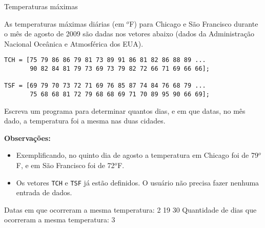 \documentclass[11pt]{practice}
\begin{document}
\begin{task}{Temperaturas máximas}{}

  As temperaturas máximas diárias (em $^o$F) para Chicago e São
  Francisco durante o mês de agosto de 2009 são dadas nos vetores abaixo
  (dados da Administração Nacional Oceânica e Atmosférica dos EUA).

  \begin{verbatim}
TCH = [75 79 86 86 79 81 73 89 91 86 81 82 86 88 89 ...
       90 82 84 81 79 73 69 73 79 82 72 66 71 69 66 66];

TSF = [69 79 70 73 72 71 69 76 85 87 74 84 76 68 79 ...
       75 68 68 81 72 79 68 68 69 71 70 89 95 90 66 69];
  \end{verbatim}

  Escreva um programa para determinar quantos dias, e em que datas, no
  mês dado, a temperatura foi a mesma nas duas cidades.

  \textbf{Observações:}\\
  \begin{itemize}
    \item Exemplificando, no quinto dia de agosto a temperatura em
    Chicago foi de 79$^o$F, e em São Francisco foi de 72$^o$F.
    \item Os vetores \texttt{TCH} e \texttt{TSF} já estão definidos. O
    usuário não precisa fazer nenhuma entrada de dados.
  \end{itemize}

  \begin{runexample}
Datas em que ocorreram a mesma temperatura:  2 19 30
Quantidade de dias que ocorreram a mesma temperatura: 3
  \end{runexample}

  \tcblower
  \solution
\end{task}




\end{document}
